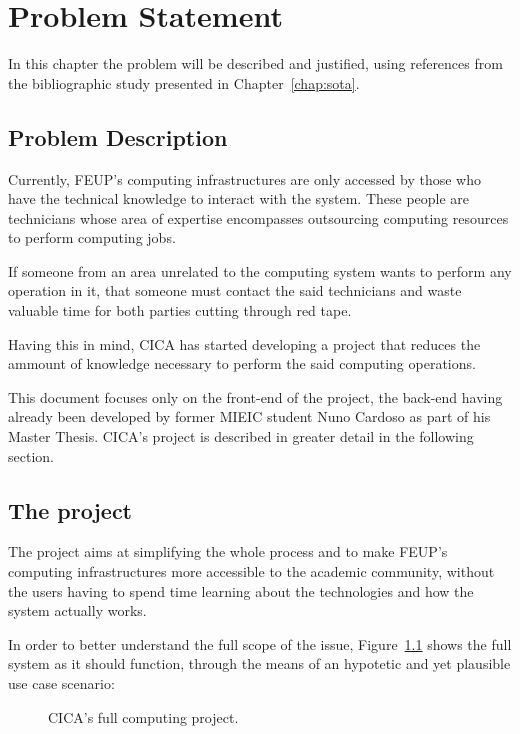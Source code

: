 \chapter{Problem Statement} \label{chap:chap3}

In this chapter the problem will be described and justified, using references from the bibliographic study presented in Chapter~\ref{chap:sota}.

\section{Problem Description}

Currently, FEUP's computing infrastructures are only accessed by those who have the technical knowledge to interact with the system. These people are technicians whose area of expertise encompasses outsourcing computing resources to perform computing jobs. 

If someone from an area unrelated to the computing system wants to perform any operation in it, that someone must contact the said technicians and waste valuable time for both parties cutting through red tape.

Having this in mind, CICA has started developing a project that reduces the ammount of knowledge necessary to perform the said computing operations.

This document focuses only on the front-end of the project, the back-end having already been developed by former MIEIC student Nuno Cardoso as part of his Master Thesis. CICA's project is described in greater detail in the following section.

\section{The project} \label{sec:project}


The project aims at simplifying the whole process and to make FEUP's computing infrastructures more accessible to the academic community, without the users having to spend time learning about the technologies and how the system actually works.

In order to better understand the full scope of the issue, Figure~\ref{fig:big_picture} shows the full system as it should function, through the means of an hypotetic and yet plausible use case scenario:

\begin{figure}[h!]
  \begin{center}
    \leavevmode
    \caption{CICA's full computing project.}
    \label{fig:big_picture}
  \end{center}
\end{figure}

